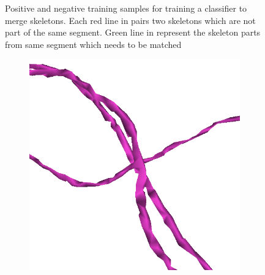 \begin{figure}[htpb]
\begin{subfigure}[b]{0.3\textwidth}
		\caption{\label{fig:negativeMatch}}
	\end{subfigure}
	\caption{Positive  and negative  training samples for training a classifier to merge skeletons. Each red line in  pairs two skeletons which are not part of the same segment. Green line in  represent the skeleton parts from same segment which needs to be matched}
	\label{fig:skelMatchTrainData}
\end{figure}


\begin{figure}[htpb]
	\centering
	\begin{subfigure}[b]{0.24\textwidth}
		\centering
		\includegraphics[width=\textwidth]{data/images/splitNMatch/skel.png}
		\caption{\label{fig:splitNMatchA}}
	\end{subfigure}
	\hfill
	\begin{subfigure}[b]{0.24\textwidth}
		\centering

\end{subfigure}
\end{figure}
